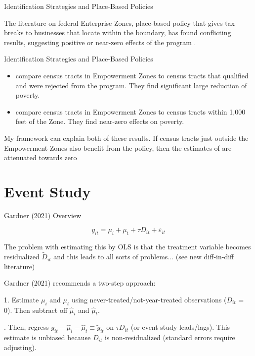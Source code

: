 \documentclass[aspectratio=169,t]{beamer}
\begin{document}
\begin{frame}{Identification Strategies and Place-Based Policies}

    The literature on federal Enterprise Zones, place-based policy that gives tax breaks to businesses that locate within the boundary, has found conflicting results, suggesting positive or near-zero effects of the program \citep{Neumark_Young_2019}. 


\end{frame}

\begin{frame}{Identification Strategies and Place-Based Policies}
    
    \begin{itemize}
        \item \citet{Busso_Gregory_Kline_2013} compare census tracts in Empowerment Zones to census tracts that qualified and were rejected from the program. They find significant large reduction of poverty.
        
        \pause
        \item \citet{Neumark_Kolko_2010} compare census tracts in Empowerment Zones to census tracts within 1,000 feet of the Zone. They find near-zero effects on poverty.
    \end{itemize}

    \pause
    My framework can explain both of these results. If census tracts just outside the Empowerment Zones also benefit from the policy, then the estimates of \citet{Neumark_Kolko_2010} are attenuated towards zero

\end{frame}

\section{Event Study}

\begin{frame}{Gardner (2021) Overview}

    \[ 
        y_{it} = \mu_i + \mu_t + \tau D_{it} + \varepsilon_{it}
    \]

    The problem with estimating this by OLS is that the treatment variable becomes residualized $\tilde{D}_{it}$ and this leads to all sorts of problems... (see new diff-in-diff literature)

    \pause

    Gardner (2021) recommends a two-step approach:

    1. Estimate $\mu_i$ and $\mu_t$ using never-treated/not-year-treated observations ($D_{it}$ = 0). Then subtract off $\hat{\mu}_i$ and $\hat{\mu}_t$.
        
    . Then, regress $y_{it} - \hat{\mu}_i - \hat{\mu}_t \equiv \tilde{y}_{it}$ on $\tau D_{it}$ (or event study leads/lags). This estimate is unbiased because $D_{it}$ is non-residualized (standard errors require adjusting).
\end{frame}
\end{document}
